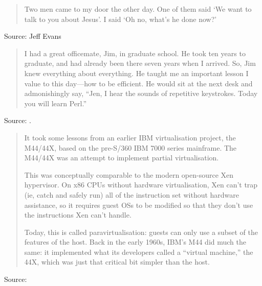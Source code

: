 \documentclass[a4paper]{article}
\begin{document}
\begin{quote}
	Two men came to my door the other day. One of them said `We want to talk to you about Jesus'.
	I said `Oh no, what's he done now?'
\end{quote}
Source: Jeff Evans
\medskip

\begin{quote}
	I had a great officemate, Jim, in graduate school. He took ten years to graduate, and had
already been there seven years when I arrived. So, Jim knew everything about everything. He taught
me an important lesson I value to this day---how to be efficient. He would sit at the next desk
and admonishingly say, ``Jen, I hear the sounds of repetitive keystrokes. Today you will learn
Perl.''
\end{quote}
Source: \citet{Rexford2010}.
\medskip

\begin{quotation}
	It took some lessons from an earlier IBM virtualisation project, the M44/44X, based on the
pre-S/360 IBM 7000 series mainframe. The M44/44X was an attempt to implement partial
virtualisation.

This was conceptually comparable to the modern open-source Xen hypervisor. On x86 CPUs without
hardware virtualisation, Xen can't trap (ie, catch and safely run) all of the instruction set
without hardware assistance, so it requires guest OSs to be modified so that they don't use the
instructions Xen can't handle.

Today, this is called paravirtualisation: guests can only use a subset of the features of the host.
Back in the early 1960s, IBM's M44 did much the same: it implemented what its developers called a
``virtual machine,'' the 44X, which was just that critical bit simpler than the host.
\end{quotation}
Source: \citet{Proven2011}
\medskip
\end{document}

